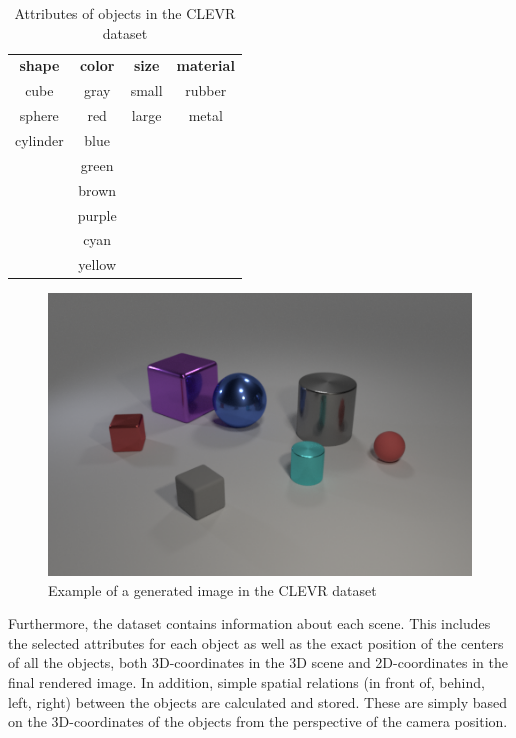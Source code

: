 \begin{table}[h]
    \centering
    \begin{tabular}{cccc}
        \toprule
        \textbf{ shape } & \textbf{ color } & \textbf{ size } & \textbf{ material } \\
        cube             & gray             & small           & rubber              \\
        sphere           & red              & large           & metal               \\
        cylinder         & blue                                                     \\
                         & green                                                    \\
                         & brown                                                    \\
                         & purple                                                   \\
                         & cyan                                                     \\
                         & yellow                                                   \\
        \bottomrule
    \end{tabular}
    \caption{Attributes of objects in the CLEVR dataset}
    \label{tab:clevr-attributes}
\end{table}

\begin{figure}[h]
    \centering
    \includegraphics[width=.8\linewidth]{figures/CLEVR_example.png}
    \caption{Example of a generated image in the CLEVR dataset}
    \label{fig:clevr-example}
\end{figure}

Furthermore, the dataset contains information about each scene.
This includes the selected attributes for each object as well as the exact position of the centers of all the objects, both 3D-coordinates in the 3D scene and 2D-coordinates in the final rendered image.
In addition, simple spatial relations (in front of, behind, left, right) between the objects are calculated and stored.
These are simply based on the 3D-coordinates of the objects from the perspective of the camera position.

